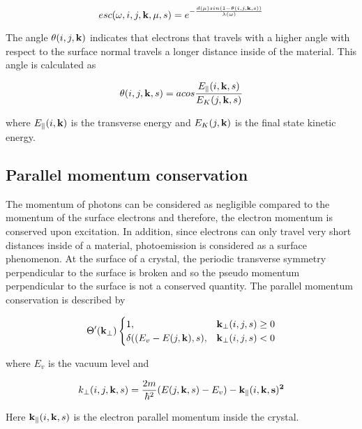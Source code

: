 \documentclass[a4paper,11pt,twoside]{book}
\begin{document}
\begin{equation}
esc(\omega,i,j,{\bf{k}},\mu,s) = e^{-\frac{d(\mu)sin(1-\theta(i,j,{\bf{k}},s))}{\lambda(\omega)}}
    \label{IMFP}
\end{equation}

The angle $\theta(i,j,\bf{k})$ indicates that electrons that travels with a higher angle with respect to the surface normal travels a longer distance inside of the material. This angle is calculated as

\begin{equation}
 \theta{(i,j, {\bf{k}},s)} = acos \frac{E_\parallel(i,{\bf{k}},s)}{E_K(j,{\bf{k}},s)}
    \label{theta}
\end{equation}

where $E_\parallel(i,\bf{k})$ is the transverse energy and $E_K(j,\bf{k})$ is the final state kinetic energy.

\subsection{Parallel momentum conservation}

The momentum of photons can be considered as negligible compared to the momentum of the surface electrons and therefore, the electron momentum is conserved upon excitation. In addition, since electrons can only travel very short distances inside of a material, photoemission is considered as a surface phenomenon. At the surface of a crystal, the periodic transverse symmetry perpendicular to the surface is broken and so the pseudo momentum perpendicular to the surface is not a conserved quantity. The parallel momentum conservation is described by

\begin{equation}
\Theta'({\bf{k}}_\perp)
\begin{cases}
    1,& {\bf{k}}_\perp(i,j,s) \geq 0\\
    \delta((E_v - E(j,{\bf{k}}),s),& {\bf{k}}_\perp(i,j,s) < 0
\end{cases}
    \label{Heaviside}
\end{equation}

where $E_v$ is the vacuum level and

\begin{equation}
k_{\perp}(i,j,{\bf{k}},s) = \frac{2m}{\hbar^2}(E(j,{\bf{k}},s)-E_v)- {\bf{k}_{\parallel}}(i,\bf{k},s)^2
    \label{E_perp}
\end{equation}

Here ${\bf{k}_{\parallel}}(i,{\bf{k}},s)$ is the electron parallel momentum inside the crystal.
\end{document}
